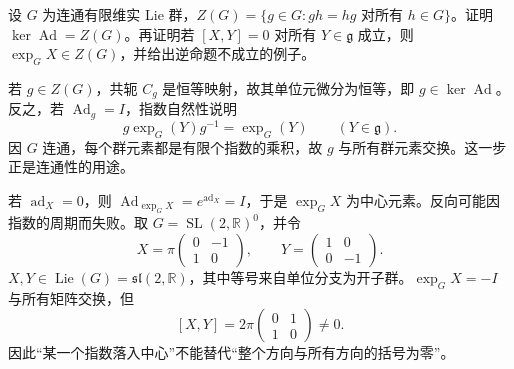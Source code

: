 \begin{exercise}\label{g1:ex:adjoint-kernel-center}
	设 \(G\) 为连通有限维实 Lie 群，\(Z(G)=\{g\in G:gh=hg\text{ 对所有 }h\in G\}\)。证明 \(\ker\operatorname{Ad}=Z(G)\)。再证明若 \([X,Y]=0\) 对所有 \(Y\in\mathfrak g\) 成立，则 \(\exp_GX\in Z(G)\)，并给出逆命题不成立的例子。
\end{exercise}
\begin{solution}
	若 \(g\in Z(G)\)，共轭 \(C_g\) 是恒等映射，故其单位元微分为恒等，即 \(g\in\ker\operatorname{Ad}\)。反之，若 \(\operatorname{Ad}_g=I\)，指数自然性说明
	\[
		g\exp_G(Y)g^{-1}=\exp_G(Y)\qquad(Y\in\mathfrak g).
	\]
	因 \(G\) 连通，每个群元素都是有限个指数的乘积，故 \(g\) 与所有群元素交换。这一步正是连通性的用途。

	若 \(\operatorname{ad}_X=0\)，则 \(\operatorname{Ad}_{\exp_GX}=e^{\operatorname{ad}_X}=I\)，于是 \(\exp_GX\) 为中心元素。反向可能因指数的周期而失败。取 \(G=\operatorname{SL}(2,\mathbb R)^0\)，并令
	\[
		X=\pi\begin{pmatrix}0&-1\\1&0\end{pmatrix},\qquad
		Y=\begin{pmatrix}1&0\\0&-1\end{pmatrix}.
	\]
	\(X,Y\in\operatorname{Lie}(G)=\mathfrak{sl}(2,\mathbb R)\)，其中等号来自单位分支为开子群。\(\exp_GX=-I\) 与所有矩阵交换，但
	\[
		[X,Y]=2\pi\begin{pmatrix}0&1\\1&0\end{pmatrix}\ne0.
	\]
	因此“某一个指数落入中心”不能替代“整个方向与所有方向的括号为零”。
\end{solution}


